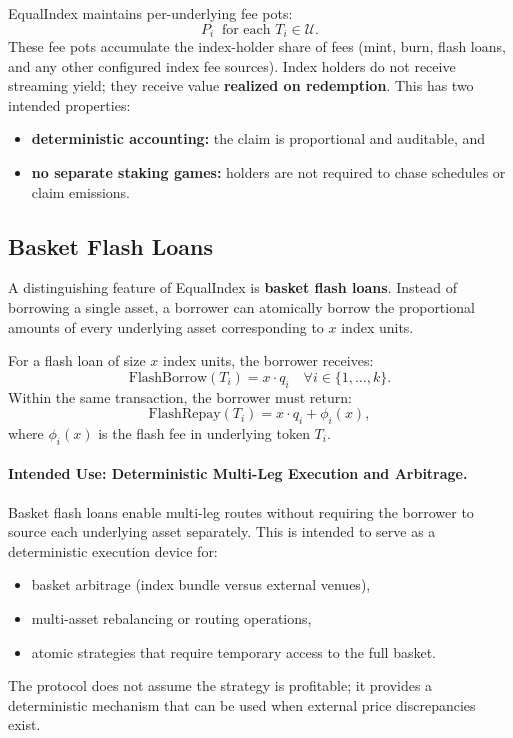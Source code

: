 \documentclass[version=preprint]{iacrcc}
\begin{document}
EqualIndex maintains per-underlying fee pots:
\[
P_i \;\; \text{for each } T_i \in \mathcal{U}.
\]
These fee pots accumulate the index-holder share of fees (mint, burn, flash loans, and any other configured index fee sources). Index holders do not receive streaming yield; they receive value \textbf{realized on redemption}. This has two intended properties:
\begin{itemize}
  \item \textbf{deterministic accounting:} the claim is proportional and auditable, and
  \item \textbf{no separate staking games:} holders are not required to chase schedules or claim emissions.
\end{itemize}

\subsection{Basket Flash Loans}

A distinguishing feature of EqualIndex is \textbf{basket flash loans}. Instead of borrowing a single asset, a borrower can atomically borrow the proportional amounts of every underlying asset corresponding to $x$ index units.

For a flash loan of size $x$ index units, the borrower receives:
\[
\text{FlashBorrow}(T_i) = x \cdot q_i
\quad \forall i \in \{1,\ldots,k\}.
\]
Within the same transaction, the borrower must return:
\[
\text{FlashRepay}(T_i) = x \cdot q_i + \phi_i(x),
\]
where $\phi_i(x)$ is the flash fee in underlying token $T_i$.

\paragraph{Intended Use: Deterministic Multi-Leg Execution and Arbitrage.}
Basket flash loans enable multi-leg routes without requiring the borrower to source each underlying asset separately. This is intended to serve as a deterministic execution device for:
\begin{itemize}
  \item basket arbitrage (index bundle versus external venues),
  \item multi-asset rebalancing or routing operations,
  \item atomic strategies that require temporary access to the full basket.
\end{itemize}
The protocol does not assume the strategy is profitable; it provides a deterministic mechanism that can be used when external price discrepancies exist.
\end{document}
